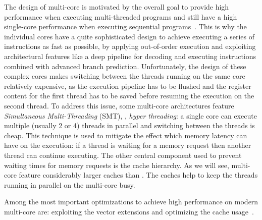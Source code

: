The design of multi-core \CPUs is motivated by the overall goal to provide high performance when executing multi-threaded programs and still have a high single-core performance when executing sequential programs~\cite{GarlandK10}.
This is why the individual cores have a quite sophisticated design to achieve executing a series of instructions as fast as possible, by applying out-of-order execution and exploiting architectural features like a deep pipeline for decoding and executing instructions combined with advanced branch prediction.
Unfortunately, the design of these complex cores makes switching between the threads running on the same core relatively expensive, as the execution pipeline has to be flushed and the register content for the first thread has to be saved before resuming the execution on the second thread.
To address this issue, some multi-core architectures feature \emph{Simultaneous Multi-Threading} (SMT), \aka, \emph{hyper threading}:
a single \CPU core can execute multiple (usually 2 or 4) threads in parallel and switching between the threads is cheap.
This technique is used to mitigate the effect which memory latency can have on the execution:
if a thread is waiting for a memory request then another thread can continue executing.
The other central component used to prevent waiting times for memory requests is the cache hierarchy.
As we will see, multi-core \CPUs feature considerably larger caches than \GPUs.
The caches help to keep the threads running in parallel on the multi-core \CPU busy.

Among the most important optimizations to achieve high performance on modern multi-core \CPUs are:
exploiting the \SIMD vector extensions and optimizing the cache usage~\cite{IntelCPUOptimizingGuide}.

